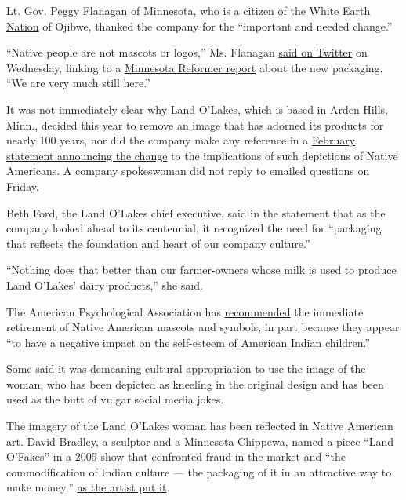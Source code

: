 Lt. Gov. Peggy Flanagan of Minnesota, who is a citizen of the
\href{https://whiteearth.com/home}{White Earth Nation} of Ojibwe,
thanked the company for the ``important and needed change.''

``Native people are not mascots or logos,'' Ms. Flanagan
\href{https://twitter.com/LtGovFlanagan/status/1250515283313414145}{said
on Twitter} on Wednesday, linking to a
\href{https://minnesotareformer.com/2020/04/15/land-olakes-quietly-gets-rid-of-iconic-indian-maiden/}{Minnesota
Reformer report} about the new packaging. ``We are very much still
here.''

It was not immediately clear why Land O'Lakes, which is based in Arden
Hills, Minn., decided this year to remove an image that has adorned its
products for nearly 100 years, nor did the company make any reference in
a
\href{https://www.landolakesinc.com/Press/News/new-butter-and-dairy-packaging}{February
statement announcing the change} to the implications of such depictions
of Native Americans. A company spokeswoman did not reply to emailed
questions on Friday.

Beth Ford, the Land O'Lakes chief executive, said in the statement that
as the company looked ahead to its centennial, it recognized the need
for ``packaging that reflects the foundation and heart of our company
culture.''

``Nothing does that better than our farmer-owners whose milk is used to
produce Land O'Lakes' dairy products,'' she said.

The American Psychological Association has
\href{https://www.apa.org/about/policy/mascots.pdf}{recommended} the
immediate retirement of Native American mascots and symbols, in part
because they appear ``to have a negative impact on the self-esteem of
American Indian children.''

Some said it was demeaning cultural appropriation to use the image of
the woman, who has been depicted as kneeling in the original design and
has been used as the butt of vulgar social media jokes.

The imagery of the Land O'Lakes woman has been reflected in Native
American art. David Bradley, a sculptor and a Minnesota Chippewa, named
a piece ``Land O'Fakes'' in a 2005 show that confronted fraud in the
market and ``the commodification of Indian culture --- the packaging of
it in an attractive way to make money,''
\href{https://www.nytimes3xbfgragh.onion/2005/08/20/arts/design/a-new-dawn-for-museums-of-native-american-art.html}{as
the artist put it}.

